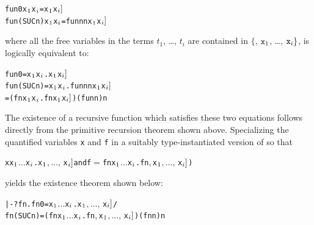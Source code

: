\begin{hol}
\begin{alltt}
   fun 0       x\(\sb{1}\) \m{\dots} x\(\sb{i}\) = \m{f\sb{1}[}x\(\sb{1}\)\m{,\ldots,\,} x\(\sb{i}]\)
   fun (SUC n) x\(\sb{1}\) \m{\dots} x\(\sb{i}\) = \m{f\sb{2}[}fun n  n\m{,} x\(\sb{1}\)\m{,\ldots,\,}x\(\sb{i}]\)
\end{alltt}
\end{hol}

\noindent where all the free variables in the  terms $t_1$,
\dots, $t_i$ are contained in $\{$, $\ml{x}_1$, \dots, $\ml{x}_i\}$,
is logically equivalent to:

\begin{hol}
\begin{alltt}
   fun 0       = \bs{}x\(\sb{1}\) \m{\dots} x\(\sb{i}\).\m{f\sb{1}[}x\(\sb{1}\)\m{,\ldots,\,}x\(\sb{i}]\)
   fun (SUC n) = \bs{}x\(\sb{1}\) \m{\dots} x\(\sb{i}\).\m{f\sb{2}[}fun n  n\m{,}x\(\sb{1}\)\m{,\ldots,\,}x\(\sb{i}]\)
               = (\bs{}f n x\(\sb{1}\) \m{\dots} x\(\sb{i}\).\m{f\sb{2}[}f  n\m{,} x\(\sb{1}\)\m{,\ldots,\,}x\(\sb{i}]\)) (fun n) n
\end{alltt}
\end{hol}

The existence  of  a  recursive  function   which  satisfies these two
equations follows directly from the primitive recursion theorem
 shown above.   Specializing the  quantified variables \verb!x!
and \verb!f!  in  a suitably  type-instantiated version  of  so
that

\begin{hol}
\begin{alltt}
   x\m{=}\bs{}x\(\sb{1}\) \(\dots\) x\(\sb{i}\).\m{f\sb{1}[}x\(\sb{1}\)\(,\ldots,\,\)x\(\sb{i}]\)  {\rm and}  f\(=\)\bs{}f n x\(\sb{1}\) \(\dots\) x\(\sb{i}\).\m{f\sb{2}[}f  n\(,\) x\(\sb{1}\)\(,\ldots,\,\)x\(\sb{i}]\))
\end{alltt}
\end{hol}

\noindent yields the existence theorem shown below:

\begin{hol}
\begin{alltt}
   |- ?fn. fn 0       = \bs{}x\(\sb{1}\) \(\dots\) x\(\sb{i}\).\m{f\sb{1}[}x\(\sb{1}\)\(,\ldots,\,\)x\(\sb{i}]\) /\bs{}
           fn (SUC n) = (\bs{}f n x\(\sb{1}\) \(\dots\) x\(\sb{i}\).\m{f\sb{2}[}f  n\(,\) x\(\sb{1}\)\(,\ldots,\,\)x\(\sb{i}]\)) (fn n) n
\end{alltt}
\end{hol}

